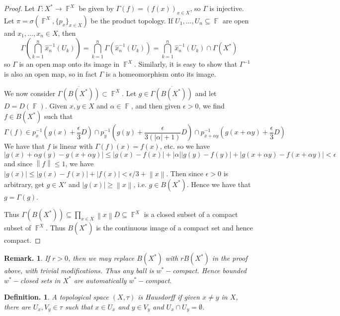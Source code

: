 \documentclass[11pt, a4paper]{memoir}
\DeclareMathOperator{\F}{{\mathbb{F}}}
\newcommand{\norm}[1]{\ensuremath{\left\lVert#1\right\rVert}}
\theoremstyle{change}
\theoremstyle{plain}
\theoremstyle{nonumberplain}
\newtheorem{definition}{Definition.}
\newtheorem{remark}{Remark.}
\newtheorem{proof}{Proof}
\numberwithin{equation}{section}
\begin{document}
\begin{proof}
    Let $\Gamma:X^*\to\F^X$ be given by $\Gamma(f)=(f(x))_{x\in X}$, so $\Gamma$ is injective.
    Let $\pi=\sigma(\F^X,\{p_x\}_{x\in X})$ be the product topology.
    If $U_1,\ldots,U_n\subseteq\F$ are open and $x_1,\ldots,x_n\in X$, then
    \begin{equation*}
        \Gamma\left(\bigcap_{k=1}^n\hat x_n^{-1}(U_k)\right)=\bigcap_{k=1}^n\Gamma\left(\hat x^{-1}_n(U_k)\right)=\bigcap_{k=1}^n \hat x_n^{-1}(U_k)\cap\Gamma(X^*)
    \end{equation*}
    so $\Gamma$ is an open map onto its image in $\F^X$.
    Similarly, it is easy to show that $\Gamma^{-1}$ is also an open map, so in fact $\Gamma$ is a homeomorphism onto its image.

    We now consider $\overline{\Gamma(B(X^*))}\subset\F^X$.
    Let $g\in \overline{\Gamma(B(X^*))}$ and let $D=D(\F)$.
    Given $x,y\in X$ and $\alpha\in\F$, and then given $\epsilon>0$, we find $f\in B(X^*)$ such that
    \begin{equation*}
        \Gamma(f)\in p_x^{-1}\left(g(x)+\frac{\epsilon}{3}D\right)\cap p_y^{-1}\left(g(y)+\frac{\epsilon}{3(|\alpha|+1)}D\right)\cap p_{x+\alpha y}^{-1}\left(g(x+\alpha y)+\frac{\epsilon}{3}D\right)
    \end{equation*}
    We have that $f$ is linear with $\Gamma(f)(x)=f(x)$, etc. so we have
    \begin{equation*}
        |g(x)+\alpha g(y)-g(x+\alpha y)|\leq|g(x)-f(x)|+|\alpha||g(y)-f(y)|+|g(x+\alpha y)-f(x+\alpha y)|<\epsilon
    \end{equation*}
    and since $\norm{f}\leq 1$, we have $|g(x)|\leq|g(x)-f(x)|+|f(x)|<\epsilon/3+\norm{x}$.
    Then since $\epsilon>0$ is arbitrary, get $g\in X'$ and $|g(x)|\geq\norm{x}$, i.e. $g\in B(X^*)$.
    Hence we have that $g=\Gamma(g)$.

    Thus $\Gamma(B(X^*))\subseteq\prod_{x\in X}\norm{x}\overline{D}\subseteq\F^X$ is a closed subset of a compact subset of $\F^X$.
    Thus $B(X^*)$ is the continuous image of a compact set and hence compact.
\end{proof}
\begin{remark}
    If $r>0$, then we may replace $B(X^*)$ with $rB(X^*)$ in the proof above, with trivial modifications.
    Thus any ball is $w^*-$compact.
    Hence bounded $w^*-$closed sets in $X^*$ are automatically $w^*-$compact.
\end{remark}
\begin{definition}
    A topological space $(X,\tau)$ is Hausdorff if given $x\neq y$ in $X$, there are $U_x,V_y\in\tau$ such that $x\in U_x$ and $y\in V_y$ and $U_x\cap U_y=\emptyset$.
\end{definition}
\end{document}
